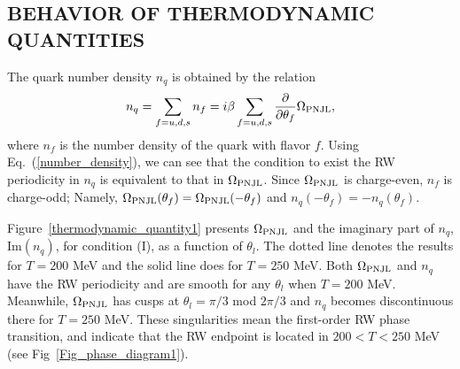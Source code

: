 \documentclass[prd,superscriptaddress,unsortedaddress,
twocolumn,showpacs,preprintnumbers,amsmath,amssymb]{revtex4}
\begin{document}
    \subsection{BEHAVIOR OF THERMODYNAMIC QUANTITIES}
    The quark number density $n_{q}$
    is obtained by the relation
    \begin{eqnarray}
     n_{q}=\sum_{f=u,d,s}n_{f}
      =i\beta\sum_{f=u,d,s}\frac{\partial}{\partial\theta_{f}}\Omega_{\rm PNJL},
      \label{number_density}
    \end{eqnarray}
    where $n_{f}$ is the number density of the quark with flavor $f$.
    Using Eq.~(\ref{number_density}), we can see that
    the condition to exist the RW periodicity in $n_{q}$
    is equivalent to that in $\Omega_{\rm PNJL}$.
    Since $\Omega_{\rm PNJL}$ is charge-even,
    $n_{f}$ is charge-odd; Namely,
    $\Omega_{\rm PNJL}(\theta_{f})=\Omega_{\rm PNJL}(-\theta_{f})$
    and
    $n_{q}(-\theta_{f})=-n_{q}(\theta_{f})$.

    Figure~\ref{thermodynamic_quantity1} presents
    $\Omega_{\rm PNJL}$ and the imaginary part 
    of $n_{q}$, $\textrm{Im}(n_{q})$,
    for condition (I),
    as a function of $\theta_{l}$.
    The dotted line denotes the results for $T=200$ MeV
    and the solid line does for $T=250$ MeV.
    Both $\Omega_{\rm PNJL}$
    and $n_{q}$ have the RW periodicity and
    are smooth for any $\theta_{l}$ when $T=200$ MeV.
    Meanwhile, $\Omega_{\rm PNJL}$ has cusps
    at $\theta_{l}=\pi/3$ mod $2\pi/3$ and $n_{q}$ becomes discontinuous there
    for $T=250$ MeV.
    These singularities mean the first-order RW phase transition,
    and indicate that the RW endpoint is located in $200< T < 250$ MeV
    (see Fig~\ref{Fig_phase_diagram1}).
\end{document}
